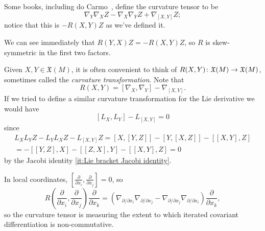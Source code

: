 \begin{remark}
	Some books, including do Carmo~\cite{docarmoRiemannianGeometry1992}, define the curvature tensor to be
	\[
		\nabla_Y\nabla_X Z - \nabla_X\nabla_YZ + \nabla_{[X,Y]}Z;
	\]
	notice that this is $-R(X,Y)Z$ as we've defined it.
\end{remark}

\begin{remark}
	We can see immediately that $R(Y,X)Z = -R(X,Y)Z$, so $R$ is skew-symmetric in the first two factors.
\end{remark}

\begin{remark}
	Given $X,Y \in \mathfrak{X}(M)$, it is often convenient to think of $R(X,Y) \colon\thinspace\! \mathfrak{X}(M) \to \mathfrak{X}(M)$, sometimes called the \emph{curvature transformation}. Note that
	\[
		R(X,Y) = [\nabla_X,\nabla_Y] - \nabla_{[X,Y]}.
	\]
	If we tried to define a similar curvature transformation for the Lie derivative we would have
	\[
		[L_X,L_Y] - L_{[X,Y]} = 0
	\]
	since
	\begin{multline*}
		L_XL_YZ - L_YL_XZ - L_{[X,Y]}Z  = [X,[Y,Z]] - [Y,[X,Z]] - [[X,Y],Z] \\
		= - [[Y,Z],X] - [[Z,X],Y] - [[X,Y],Z] = 0
	\end{multline*}
	by the Jacobi identity \ref{it:Lie bracket Jacobi identity}.
\end{remark}

\begin{remark}
	In local coordinates, $\left[\frac{\partial}{\partial x_i},\frac{\partial}{\partial x_j} \right] = 0$, so
	\[
		R\left(\frac{\partial}{\partial x_i},\frac{\partial}{\partial x_j}\right)\frac{\partial}{\partial x_k} = \left(\nabla_{\partial/\partial x_i} \nabla_{\partial/\partial x_j} - \nabla_{\partial/\partial x_j} \nabla_{\partial/\partial x_i}\right)\frac{\partial}{\partial x_k},
	\]
	so the curvature tensor is measuring the extent to which iterated covariant differentiation is non-commutative.
\end{remark}

